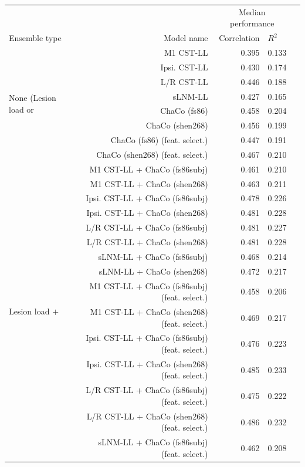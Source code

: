 \documentclass[10pt]{article}
\def\Plus{\texttt{+}}
\begin{document}
\newpage 
\newpage

\begin{table}[h]
\centering
\label{table:5}
\begin{tabular}{lrrll}
\toprule
 &  & \multicolumn{2}{c}{Median performance} \\
Ensemble type & Model name & Correlation & $R^2$  \\
\midrule
\multirow[t]{8}{*}{None (Lesion load or} & M1 CST-LL & 0.395 & 0.133 \\
 ChaCo only)& Ipsi. CST-LL & 0.430 & 0.174 \\
 & L/R CST-LL & 0.446 & 0.188 \\
 & sLNM-LL & 0.427 & 0.165 \\
 & ChaCo (fs86) & 0.458 & 0.204 \\
 & ChaCo (shen268) & 0.456 & 0.199 \\
 & ChaCo (fs86) (feat. select.) & 0.447 & 0.191 \\
 & ChaCo (shen268) (feat. select.) & 0.467 & 0.210 \\
\multirow[t]{16}{*}{Lesion load $\Plus$} & M1 CST-LL + ChaCo (fs86subj) & 0.461 & 0.210 \\
 ChaCo & M1 CST-LL + ChaCo (shen268) & 0.463 & 0.211 \\
 & Ipsi. CST-LL + ChaCo (fs86subj) & 0.478 & 0.226 \\
 & Ipsi. CST-LL + ChaCo (shen268) & 0.481 & 0.228 \\
 & L/R CST-LL + ChaCo (fs86subj) & 0.481 & 0.227 \\
 & L/R CST-LL + ChaCo (shen268) & 0.481 & 0.228 \\
 & sLNM-LL + ChaCo (fs86subj) & 0.468 & 0.214 \\
 & sLNM-LL + ChaCo (shen268) & 0.472 & 0.217 \\
 & M1 CST-LL + ChaCo (fs86subj) (feat. select.) & 0.458 & 0.206 \\
 & M1 CST-LL + ChaCo (shen268) (feat. select.) & 0.469 & 0.217 \\
 & Ipsi. CST-LL + ChaCo (fs86subj) (feat. select.) & 0.476 & 0.223 \\
 & Ipsi. CST-LL + ChaCo (shen268) (feat. select.) & 0.485 & 0.233 \\
 & L/R CST-LL + ChaCo (fs86subj) (feat. select.) & 0.475 & 0.222 \\
 & L/R CST-LL + ChaCo (shen268) (feat. select.) & 0.486 & 0.232 \\
 & sLNM-LL + ChaCo (fs86subj) (feat. select.) & 0.462 & 0.208 \\

\end{tabular}
\end{table}
\end{document}
